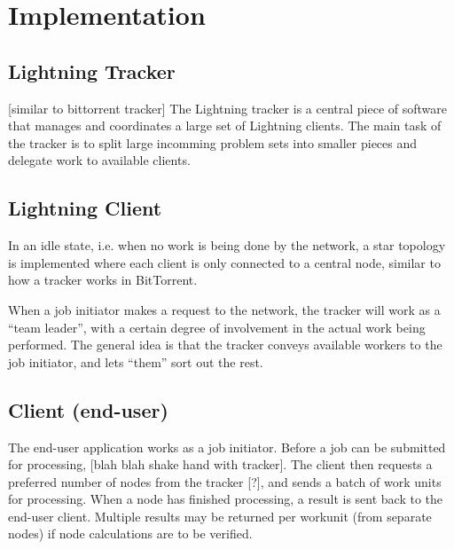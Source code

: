 \chapter{Implementation}
 
\section{Lightning Tracker}
[similar to bittorrent tracker]
The Lightning tracker is a central piece of software that manages and coordinates a large set
of Lightning clients. The main task of the tracker is to split large incomming problem sets into smaller pieces and delegate work to available clients.

\section{Lightning Client}
In an idle state, i.e. when no work is being done by the network, a star topology is implemented where each client is only connected to a central node, similar to how a tracker works in BitTorrent.

When a job initiator makes a request to the network, the tracker will work as a “team leader”,  with a certain degree of involvement in the actual work being performed. The general idea is that the tracker conveys available workers to the job initiator, and lets “them” sort out the rest.


\section{Client (end-user)}
The end-user application works as a job initiator. Before a job can be submitted for processing, [blah blah shake hand with tracker]. The client then requests a preferred number of nodes from the tracker [?], and sends a batch of work units for processing. When a node has finished processing, a result is sent back to the end-user client. Multiple results may be returned per workunit (from separate nodes) if node calculations are to be verified.


